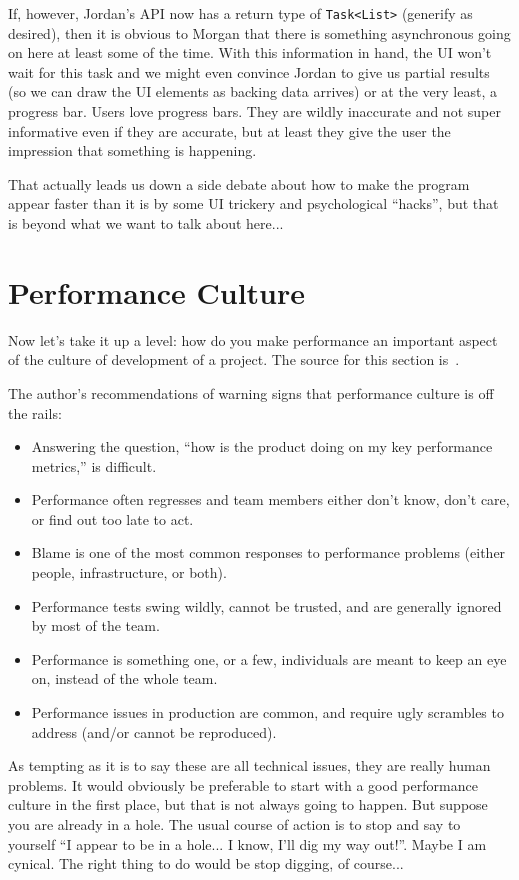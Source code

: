 \documentclass[a4paper]{report}
\begin{document}
If, however, Jordan's API now has a return type of \texttt{Task<List>} (generify as desired), then it is obvious to Morgan that there is something asynchronous going on here at least some of the time. With this information in hand, the UI won't wait for this task and we might even convince Jordan to give us partial results (so we can draw the UI elements as backing data arrives) or at the very least, a progress bar. Users love progress bars. They are wildly inaccurate and not super informative even if they are accurate, but at least they give the user the impression that something is happening.

That actually leads us down a side debate about how to make the program appear faster than it is by some UI trickery and psychological ``hacks'', but that is beyond what we want to talk about here...

\section*{Performance Culture}

Now let's take it up a level: how do you make performance an important aspect of the culture of development of a project. The source for this section is~\cite{perfculture}.

The author's recommendations of warning signs that performance culture is off the rails:

\begin{itemize}
\item Answering the question, ``how is the product doing on my key performance metrics,'' is difficult.
\item Performance often regresses and team members either don't know, don't care, or find out too late to act.
\item Blame is one of the most common responses to performance problems (either people, infrastructure, or both).
\item Performance tests swing wildly, cannot be trusted, and are generally ignored by most of the team.
\item Performance is something one, or a few, individuals are meant to keep an eye on, instead of the whole team.
\item Performance issues in production are common, and require ugly scrambles to address (and/or cannot be reproduced).
\end{itemize}

As tempting as it is to say these are all technical issues, they are really human problems. It would obviously be preferable to start with a good performance culture in the first place, but that is not always going to happen. But suppose you are already in a hole. The usual course of action is to stop and say to yourself ``I appear to be in a hole... I know, I'll dig my way out!''. Maybe I am cynical. The right thing to do would be stop digging, of course...
\end{document}
